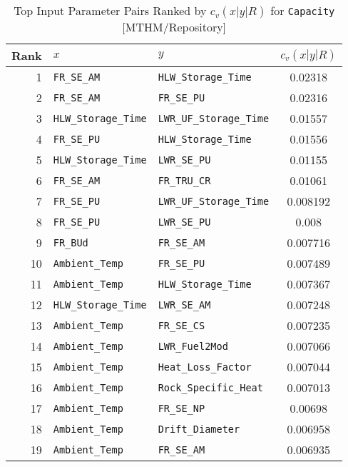 \begin{center}
\begin{table}[htbp]
\caption{Top Input Parameter Pairs Ranked by $c_v(x|y|R)$ for \texttt{Capacity} [MTHM/Repository]}
\label{cv_x_y_R_for_Capacity_with_IJK7}
\begin{center}
\begin{tabular}{|r|l|l|c|}
\hline
Rank&\textbf{$x$}&\textbf{$y$}&\textbf{$c_v(x|y|R)$}\\
\hline
1&\texttt{FR\_SE\_AM}&\texttt{HLW\_Storage\_Time}&0.02318\\
\hline
2&\texttt{FR\_SE\_AM}&\texttt{FR\_SE\_PU}&0.02316\\
\hline
3&\texttt{HLW\_Storage\_Time}&\texttt{LWR\_UF\_Storage\_Time}&0.01557\\
\hline
4&\texttt{FR\_SE\_PU}&\texttt{HLW\_Storage\_Time}&0.01556\\
\hline
5&\texttt{HLW\_Storage\_Time}&\texttt{LWR\_SE\_PU}&0.01155\\
\hline
6&\texttt{FR\_SE\_AM}&\texttt{FR\_TRU\_CR}&0.01061\\
\hline
7&\texttt{FR\_SE\_PU}&\texttt{LWR\_UF\_Storage\_Time}&0.008192\\
\hline
8&\texttt{FR\_SE\_PU}&\texttt{LWR\_SE\_PU}&0.008\\
\hline
9&\texttt{FR\_BUd}&\texttt{FR\_SE\_AM}&0.007716\\
\hline
10&\texttt{Ambient\_Temp}&\texttt{FR\_SE\_PU}&0.007489\\
\hline
11&\texttt{Ambient\_Temp}&\texttt{HLW\_Storage\_Time}&0.007367\\
\hline
12&\texttt{HLW\_Storage\_Time}&\texttt{LWR\_SE\_AM}&0.007248\\
\hline
13&\texttt{Ambient\_Temp}&\texttt{FR\_SE\_CS}&0.007235\\
\hline
14&\texttt{Ambient\_Temp}&\texttt{LWR\_Fuel2Mod}&0.007066\\
\hline
15&\texttt{Ambient\_Temp}&\texttt{Heat\_Loss\_Factor}&0.007044\\
\hline
16&\texttt{Ambient\_Temp}&\texttt{Rock\_Specific\_Heat}&0.007013\\
\hline
17&\texttt{Ambient\_Temp}&\texttt{FR\_SE\_NP}&0.00698\\
\hline
18&\texttt{Ambient\_Temp}&\texttt{Drift\_Diameter}&0.006958\\
\hline
19&\texttt{Ambient\_Temp}&\texttt{FR\_SE\_AM}&0.006935\\

\end{tabular}
\end{center}
\end{table}
\end{center}
